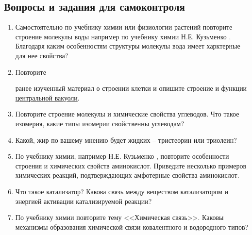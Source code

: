 
\subsection*{Вопросы и задания для самоконтроля}

\begin{enumerate}
	\item Самостоятельно по учебнику химии или физиологии растений повторите строение молекулы \hypertarget{question_aqua}{воды} например по учебнику химии Н.Е. Кузьменко \cite{chem_kuzmenko_eremin}. Благодаря каким особенностям структуры молекулы вода имеет харктерные для нее свойства?
	\item \hypertarget{question_vakual_rep}{Повторите} ранее изученный материал о строении клетки и опишите строение и функции \hyperlink{cell_vakuol}{центральной вакуоли}.
	\item Повторите строение молекулы и химические свойства углеводов. Что такое \hypertarget{question_isomeria_gluc}{изомерия}, какие типы изомерии свойственны углеводам?
	\item Какой, \hypertarget{question_lipid}{жир} по вашему мнению будет жидких -- тристеорин или триолеин?\cite{green_bio}
	\item По учебнику химии, например Н.Е. Кузьменко \cite{chem_kuzmenko_eremin}, повторите особенности строения и химических свойств \hypertarget{aminoacids}{аминокислот}. Приведите несколько примеров химических реакций, подтверждающих амфотерные свойства аминокислот.
	\item Что такое \hypertarget{catalith}{катализатор}? Какова связь между веществом катализатором и энергией активации катализируемой реакции? 
	\item По учебнику химии повторите тему <<\hypertarget{question_chem_bounds}{Химическая связь}>>. Каковы механизмы образования химической связи ковалентного и водородного типов?
\end{enumerate}